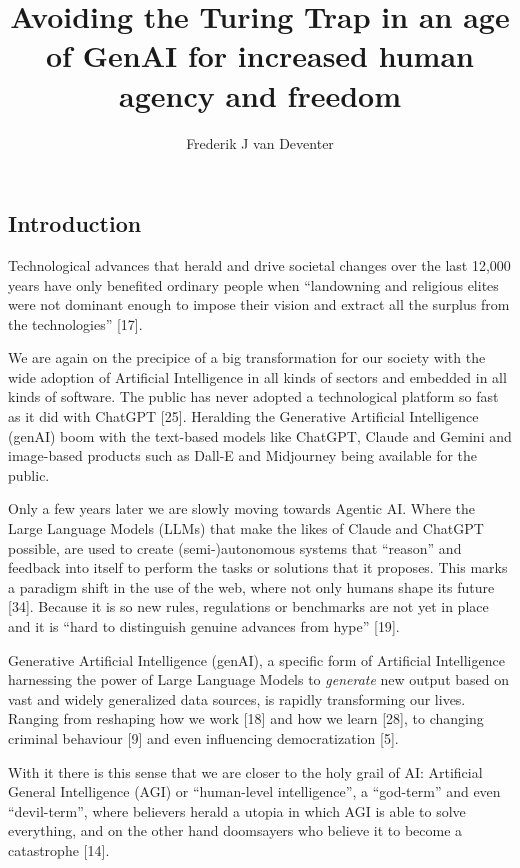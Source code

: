 \documentclass[
  letterpaper,
  DIV=11,
  numbers=noendperiod]{scrartcl}
\title{Avoiding the Turing Trap in an age of GenAI for increased human
agency and freedom}
\author{Frederik J van Deventer}
\date{}
\begin{document}
\maketitle


\subsection{Introduction}\label{introduction}

Technological advances that herald and drive societal changes over the
last 12,000 years have only benefited ordinary people when ``landowning
and religious elites were not dominant enough to impose their vision and
extract all the surplus from the technologies'' {[}17{]}.

We are again on the precipice of a big transformation for our society
with the wide adoption of Artificial Intelligence in all kinds of
sectors and embedded in all kinds of software. The public has never
adopted a technological platform so fast as it did with ChatGPT
{[}25{]}. Heralding the Generative Artificial Intelligence (genAI) boom
with the text-based models like ChatGPT, Claude and Gemini and
image-based products such as Dall-E and Midjourney being available for
the public.

Only a few years later we are slowly moving towards Agentic AI. Where
the Large Language Models (LLMs) that make the likes of Claude and
ChatGPT possible, are used to create (semi-)autonomous systems that
``reason'' and feedback into itself to perform the tasks or solutions
that it proposes. This marks a paradigm shift in the use of the web,
where not only humans shape its future {[}34{]}. Because it is so new
rules, regulations or benchmarks are not yet in place and it is ``hard
to distinguish genuine advances from hype'' {[}19{]}.

Generative Artificial Intelligence (genAI), a specific form of
Artificial Intelligence harnessing the power of Large Language Models to
\emph{generate} new output based on vast and widely generalized data
sources, is rapidly transforming our lives. Ranging from reshaping how
we work {[}18{]} and how we learn {[}28{]}, to changing criminal
behaviour {[}9{]} and even influencing democratization {[}5{]}.

With it there is this sense that we are closer to the holy grail of AI:
Artificial General Intelligence (AGI) or ``human-level intelligence'', a
``god-term'' and even ``devil-term'', where believers herald a utopia in
which AGI is able to solve everything, and on the other hand doomsayers
who believe it to become a catastrophe {[}14{]}.
\end{document}
